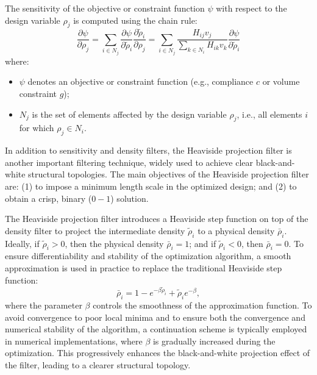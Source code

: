 \documentclass[mathpazo]{cicp}
\begin{document}
The sensitivity of the objective or constraint function $\psi$ with respect to the design variable $\rho_j$ is computed using the chain rule:
\begin{equation*}
	\frac{\partial\psi}{\partial{\rho}_j} = \sum_{i\in{N}_j}\frac{\partial\psi}{\partial\tilde\rho_i}\frac{\partial\tilde\rho_i}{\partial\rho_j} = \sum_{i\in{N}_j}\frac{H_{ij}v_j}{\sum_{k\in{N}_i}H_{ik}v_k}\frac{\partial\psi}{\partial\tilde\rho_i}
\end{equation*}
where:
\begin{itemize} 
	\item $\psi$ denotes an objective or constraint function (e.g., compliance $c$ or volume constraint $g$);
	\item $N_j$ is the set of elements affected by the design variable $\rho_j$, i.e., all elements $i$ for which $\rho_j \in N_i$. 
\end{itemize}

In addition to sensitivity and density filters, the Heaviside projection filter is another important filtering technique, widely used to achieve clear black-and-white structural topologies\cite{guest2004achieving}. The main objectives of the Heaviside projection filter are: (1) to impose a minimum length scale in the optimized design; and (2) to obtain a crisp, binary ($0-1$) solution.

The Heaviside projection filter introduces a Heaviside step function on top of the density filter to project the intermediate density $\tilde{\rho}_i$ to a physical density $\bar{\rho}_i$.  Ideally, if $\tilde{\rho}_i > 0$, then the physical density $\bar{\rho}_i = 1$; and if $\tilde{\rho}_i < 0$, then $\bar{\rho}_i = 0$. To ensure differentiability and stability of the optimization algorithm, a smooth approximation is used in practice to replace the traditional Heaviside step function:
\begin{equation*}
	\bar\rho_i= 1 - e^{-\beta\tilde\rho_i} + \tilde\rho_ie^{-\beta},
\end{equation*}
where the parameter $\beta$ controls the smoothness of the approximation function. To avoid convergence to poor local minima and to ensure both the convergence and numerical stability of the algorithm, a continuation scheme is typically employed in numerical implementations, where $\beta$ is gradually increased during the optimization. This progressively enhances the black-and-white projection effect of the filter, leading to a clearer structural topology.
\end{document}
